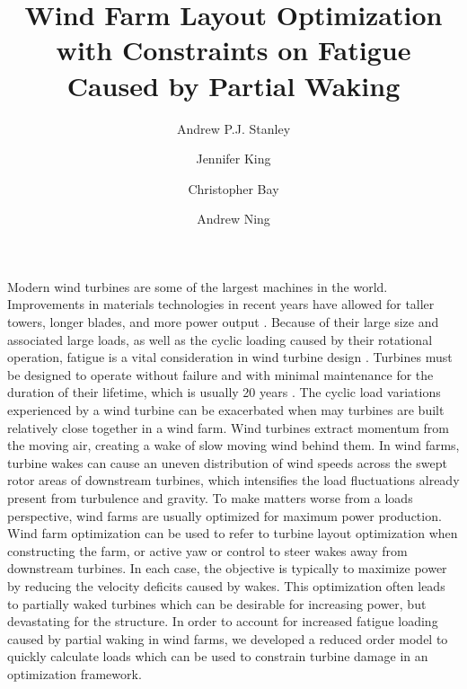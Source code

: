 \documentclass[11pt,letterpaper]{article}
\begin{document}
\title{Wind Farm Layout Optimization with Constraints on Fatigue Caused by Partial Waking}
\date{}

\author[1]{Andrew P.J. Stanley}
\author[2]{Jennifer King}
\author[2]{Christopher Bay}
\author[1]{Andrew Ning}




\maketitle



\begin{abstract}
\end{abstract}

Modern wind turbines are some of the largest machines in the world. Improvements in materials technologies in recent years have allowed for taller towers, longer blades, and more power output \cite{wiser2016reducing,enevoldsen2019examining}. Because of their large size and associated large loads, as well as the cyclic loading caused by their rotational operation, fatigue is a vital consideration in wind turbine design \cite{hubler2019validation}. Turbines must be designed to operate without failure and with minimal maintenance for the duration of their lifetime, which is usually 20 years \cite{hu2016reliability,ziegler2018lifetime}. The cyclic load variations experienced by a wind turbine can be exacerbated when may turbines are built relatively close together in a wind farm. Wind turbines extract momentum from the moving air, creating a wake of slow moving wind behind them. In wind farms, turbine wakes can cause an uneven distribution of wind speeds across the swept rotor areas of downstream turbines, which intensifies the load fluctuations already present from turbulence and gravity. To make matters worse from a loads perspective, wind farms are usually optimized for maximum power production. Wind farm optimization can be used to refer to turbine layout optimization when constructing the farm, or active yaw or control to steer wakes away from downstream turbines. In each case, the objective is typically to maximize power by reducing the velocity deficits caused by wakes. This optimization often leads to partially waked turbines which can be desirable for increasing power, but devastating for the structure. In order to account for increased fatigue loading caused by partial waking in wind farms, we developed a reduced order model to quickly calculate loads which can be used to constrain turbine damage in an optimization framework. 
\end{document}

